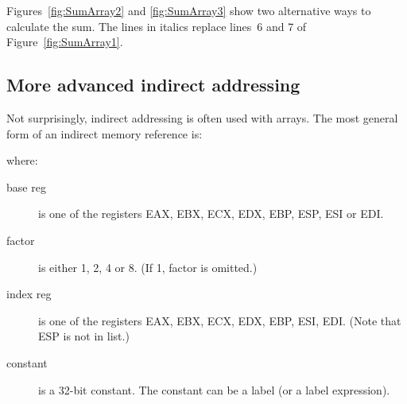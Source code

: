 Figures~\ref{fig:SumArray2} and \ref{fig:SumArray3} show two alternative
ways to calculate the sum. The lines in italics replace lines~6 and 7
of Figure~\ref{fig:SumArray1}.

\subsection{More advanced indirect addressing}

Not surprisingly, indirect addressing is often used with arrays. The most
general form of an indirect memory reference is:
\begin{center}
{}
\end{center}
where:
\begin{description}
\item[base reg] is one of the registers EAX, EBX, ECX, EDX, EBP, ESP, ESI
                or EDI.
\item[factor] is either 1, 2, 4 or 8. (If 1, factor is omitted.)
\item[index reg] is one of the registers EAX, EBX, ECX, EDX, EBP, ESI, EDI.
                 (Note that ESP is not in list.)
\item[constant] is a 32-bit constant. The constant can be a label (or
                a label expression).
\end{description}


